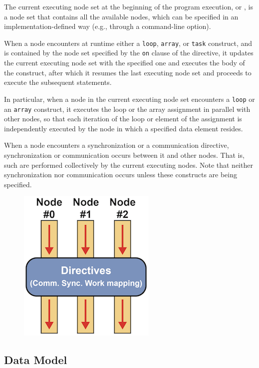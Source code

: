 The current executing node set at the beginning of the program
execution, or {\it {}}, is a node set that
contains all the available nodes, which can be specified in an 
implementation-defined way (e.g., through a command-line option).

When a node encounters at runtime either a {\tt loop}, {\tt array}, or
{\tt task} construct, and is contained by the node set specified by the
{\tt on} clause of the directive, it updates the current executing node
set with the specified one and executes the body of the construct, after
which it resumes the last executing node set and proceeds to execute the
subsequent statements.

In particular, when a node in the current executing node set encounters a
{\tt loop} or an {\tt array} construct, it executes the loop or the array
assignment in parallel with other nodes, so that each iteration of the
loop or element of the assignment is independently executed by the node
in which a specified data element resides.

When a node encounters a synchronization or a communication directive,
synchronization or communication occurs between it and other nodes.
%
That is, such {\it {}} are performed collectively
by the current executing nodes.
%
Note that neither synchronization nor communication occurs unless these
constructs are being specified.

\begin{figure}
  \centering
  \includegraphics{figs/execution.png}
\end{figure}


\subsection{Data Model}

